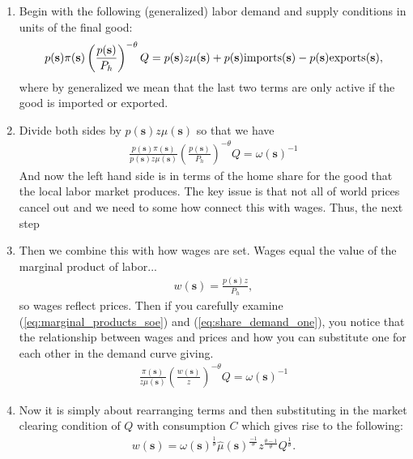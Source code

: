 \documentclass[pdftex,12pt]{article}
\begin{document}
\begin{enumerate}
\item Begin with the following (generalized) labor demand and supply conditions in units of the final good:
    \begin{align}
p(\textbf{s})\pi(\textbf{s}) \left(\frac{p(\textbf{s})}{P_h}\right)^{-\theta}Q=  p(\textbf{s}) z\mu(\textbf{s}) + p(\textbf{s})\mbox{\normalfont imports}(\textbf{s}) - p(\textbf{s})\mbox{\normalfont exports(\textbf{s})} ,
    \end{align}
where by generalized we mean that the last two terms are only active if the good is imported or exported.

\item Divide both sides by $p(\textbf{s})z\mu(\textbf{s})$ so that we have
    \begin{align}
\frac{p(\textbf{s})\pi(\textbf{s})}{p(\textbf{s})z\mu(\textbf{s})}  \left(\frac{p(\textbf{s})}{P_h}\right)^{-\theta}Q=  \omega(\textbf{s})^{-1}
\label{eq:share_demand_one}
    \end{align}
And now the left hand side is in terms of the home share for the good that the local labor market produces. The key issue is that not all of world prices cancel out and we need to some how connect this with wages. Thus, the next step

\item Then we combine this with how wages are set. Wages equal the value of the marginal product of labor...
\begin{align}
w(\textbf{s}) = \frac{p(\textbf{s}) z}{P_h},
\end{align}
so wages reflect prices. Then if you carefully examine (\ref{eq:marginal_products_soe}) and (\ref{eq:share_demand_one}), you notice that the relationship between wages and prices and how you can substitute one for each other in the demand curve giving.
\begin{align}
\frac{\pi(\textbf{s})}{z\mu(\textbf{s})}  \left(\frac{w(\textbf{s})}{z}\right)^{-\theta}Q=  \omega(\textbf{s})^{-1}
\end{align}

\item Now it is simply about rearranging terms and then substituting in the market clearing condition of $Q$ with consumption $C$ which gives rise to the following:
\begin{align}
 w(\textbf{s}) = \omega(\textbf{s})^{\frac{1}{\theta}} \hat \mu( \textbf{s})^{\frac{-1}{\theta}}z^{\frac{\theta-1}{\theta}} Q^{\frac{1}{\theta}}.
\end{align}
\end{enumerate}
\end{document}
